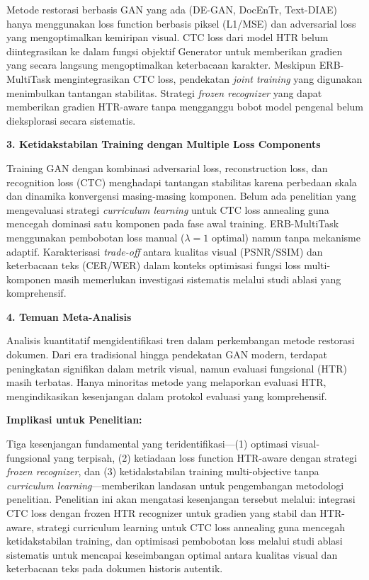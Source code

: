 \documentclass[12pt,a4paper]{article}
\begin{document}
Metode restorasi berbasis GAN yang ada (DE-GAN, DocEnTr, Text-DIAE) hanya menggunakan loss function berbasis piksel (L1/MSE) dan adversarial loss yang mengoptimalkan kemiripan visual. CTC loss dari model HTR belum diintegrasikan ke dalam fungsi objektif Generator untuk memberikan gradien yang secara langsung mengoptimalkan keterbacaan karakter. Meskipun ERB-MultiTask mengintegrasikan CTC loss, pendekatan \textit{joint training} yang digunakan menimbulkan tantangan stabilitas. Strategi \textit{frozen recognizer} yang dapat memberikan gradien HTR-aware tanpa mengganggu bobot model pengenal belum dieksplorasi secara sistematis.

\vspace{0.5em}
\noindent\textbf{3. Ketidakstabilan Training dengan Multiple Loss Components}

Training GAN dengan kombinasi adversarial loss, reconstruction loss, dan recognition loss (CTC) menghadapi tantangan stabilitas karena perbedaan skala dan dinamika konvergensi masing-masing komponen. Belum ada penelitian yang mengevaluasi strategi \textit{curriculum learning} untuk CTC loss annealing guna mencegah dominasi satu komponen pada fase awal training. ERB-MultiTask menggunakan pembobotan loss manual ($\lambda=1$ optimal) namun tanpa mekanisme adaptif. Karakterisasi \textit{trade-off} antara kualitas visual (PSNR/SSIM) dan keterbacaan teks (CER/WER) dalam konteks optimisasi fungsi loss multi-komponen masih memerlukan investigasi sistematis melalui studi ablasi yang komprehensif.

\vspace{0.5em}
\noindent\textbf{4. Temuan Meta-Analisis}

Analisis kuantitatif mengidentifikasi tren dalam perkembangan metode restorasi dokumen. Dari era tradisional hingga pendekatan GAN modern, terdapat peningkatan signifikan dalam metrik visual, namun evaluasi fungsional (HTR) masih terbatas. Hanya minoritas metode yang melaporkan evaluasi HTR, mengindikasikan kesenjangan dalam protokol evaluasi yang komprehensif.

\vspace{1ex}
\noindent\textbf{Implikasi untuk Penelitian:}

Tiga kesenjangan fundamental yang teridentifikasi—(1) optimasi visual-fungsional yang terpisah, (2) ketiadaan loss function HTR-aware dengan strategi \textit{frozen recognizer}, dan (3) ketidakstabilan training multi-objective tanpa \textit{curriculum learning}—memberikan landasan untuk pengembangan metodologi penelitian. Penelitian ini akan mengatasi kesenjangan tersebut melalui: integrasi CTC loss dengan frozen HTR recognizer untuk gradien yang stabil dan HTR-aware, strategi curriculum learning untuk CTC loss annealing guna mencegah ketidakstabilan training, dan optimisasi pembobotan loss melalui studi ablasi sistematis untuk mencapai keseimbangan optimal antara kualitas visual dan keterbacaan teks pada dokumen historis autentik.

\newpage

\end{document}
